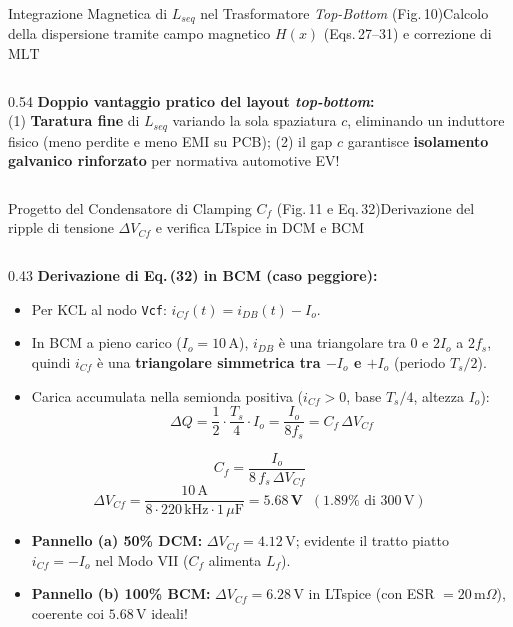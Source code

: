 \documentclass[aspectratio=169,9pt]{beamer}
\newcommand{\V}{\,\text{V}}
\newcommand{\A}{\,\text{A}}
\newcommand{\kHz}{\,\text{kHz}}
\newcommand{\uF}{\,\mu\text{F}}
\newcommand{\mOhm}{\,\text{m}\Omega}
\begin{document}
\begin{frame}{Integrazione Magnetica di $L_{seq}$ nel Trasformatore \emph{Top-Bottom} (Fig.\,10)}{Calcolo della dispersione tramite campo magnetico $H(x)$ (Eqs.\,27--31) e correzione di $\mathrm{MLT}$}
\begin{columns}[T,onlytextwidth]
\begin{column}{0.54\textwidth}
      \textbf{\color{PrimaryBlue}Doppio vantaggio pratico del layout \emph{top-bottom}:}\\
      (1) \textbf{Taratura fine} di $L_{seq}$ variando la sola spaziatura $c$, eliminando un induttore fisico (meno perdite e meno EMI su PCB); (2) il gap $c$ garantisce \textbf{isolamento galvanico rinforzato} per normativa automotive EV!
    \end{column}
  \end{columns}
\end{frame}

\begin{frame}{Progetto del Condensatore di Clamping $C_f$ (Fig.\,11 e Eq.\,32)}{Derivazione del ripple di tensione $\Delta V_{Cf}$ e verifica LTspice in DCM e BCM}
  \begin{columns}[T,onlytextwidth]
    \begin{column}{0.43\textwidth}
      \scriptsize
      \textbf{\color{PrimaryBlue}Derivazione di Eq.\,(32) in BCM (caso peggiore):}
      \begin{itemize}\setlength{\itemsep}{2pt}
        \item Per KCL al nodo \texttt{Vcf}: $i_{Cf}(t) = i_{DB}(t) - I_o$.
        \item In BCM a pieno carico ($I_o = 10\A$), $i_{DB}$ \`e una triangolare tra $0$ e $2I_o$ a $2f_s$, quindi $i_{Cf}$ \`e una \textbf{triangolare simmetrica tra $-I_o$ e $+I_o$} (periodo $T_s/2$).
        \item Carica accumulata nella semionda positiva ($i_{Cf}>0$, base $T_s/4$, altezza $I_o$):
          \[
            \Delta Q = \frac{1}{2}\cdot\frac{T_s}{4}\cdot I_o = \frac{I_o}{8 f_s} = C_f\,\Delta V_{Cf}
          \]
      \end{itemize}
      \begin{okbox}[title={Eq.\,(32) --- ESATTA nel Paper!}]
        \[
          C_f = \frac{I_o}{8\,f_s\,\Delta V_{Cf}}
        \]
        \[
          \Delta V_{Cf} = \frac{10\A}{8\cdot 220\kHz\cdot 1\uF} = \mathbf{5.68\V}\;\;(1.89\% \text{ di } 300\V)
        \]
      \end{okbox}
      \vspace*{1mm}
      \begin{itemize}\setlength{\itemsep}{1.5pt}
        \item \textbf{Pannello (a) 50\% DCM:} $\Delta V_{Cf}=4.12\V$; evidente il tratto piatto $i_{Cf}=-I_o$ nel Modo VII ($C_f$ alimenta $L_f$).
        \item \textbf{Pannello (b) 100\% BCM:} $\Delta V_{Cf}=6.28\V$ in LTspice (con ESR $=20\mOhm$), coerente coi $5.68\V$ ideali!

\end{itemize}
\end{column}
\end{columns}
\end{frame}
\end{document}
